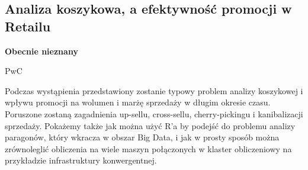 \documentclass[\main/boa.tex]{subfiles}
\begin{document}
\subsection{Analiza koszykowa, a efektywność promocji w Retailu}

\begin{minipage}{0.915\textwidth}
	\centering
  {\bf {} Obecnie nieznany}
\end{minipage}


\begin{affiliations}
\begin{minipage}{0.915\textwidth}
\centering
PwC \\[-2pt]
\end{minipage}
\end{affiliations}

\vskip 0.3cm

 Podczas wystąpienia przedstawiony zostanie typowy problem analizy koszykowej \break i wpływu promocji na wolumen i marżę sprzedaży w długim okresie czasu. Poruszone zostaną zagadnienia up-sellu, cross-sellu, cherry-pickingu i kanibalizacji sprzedaży. Pokażemy także jak można użyć R'a by podejść do problemu analizy paragonów, który wkracza w obszar Big Data, i jak w prosty sposób można zrównoleglić obliczenia na wiele maszyn połączonych w klaster obliczeniowy na przykładzie infrastruktury konwergentnej. 
\end{document}
